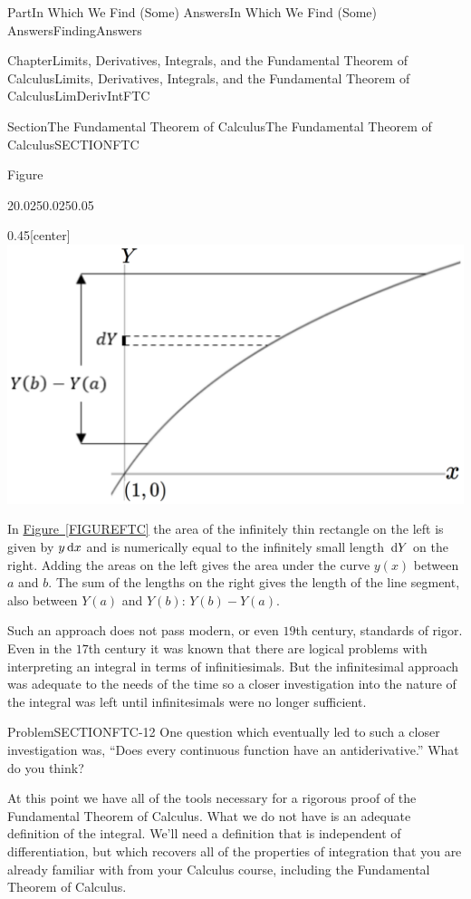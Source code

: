 \documentclass[oneside,10pt,]{book}
\newcommand{\xreffont}{\relax}
\numberwithin{equation}{part}
\newcommand{\dx}[1]{\,{\rm d}#1}
\begin{document}
\begin{partptx}{Part}{In Which We Find (Some) Answers}{}{In Which We Find (Some) Answers}{}{}{FindingAnswers}
\begin{chapterptx}{Chapter}{Limits, Derivatives, Integrals, and the Fundamental Theorem of Calculus}{}{Limits, Derivatives, Integrals, and the Fundamental Theorem of Calculus}{}{}{LimDerivIntFTC}
\begin{sectionptx}{Section}{The Fundamental Theorem of Calculus}{}{The Fundamental Theorem of Calculus}{}{}{SECTIONFTC}
\begin{figureptx}{Figure}
\begin{sidebyside}{2}{0.025}{0.025}{0.05}
\begin{sbspanel}{0.45}[center]%
\noindent\includegraphics[width=\linewidth]{external/images/FTC2.png}
\end{sbspanel}%
\end{sidebyside}%
\tcblower
\end{figureptx}%
In \hyperref[FIGUREFTC]{Figure~{\xreffont\ref{FIGUREFTC}}} the area of the infinitely thin rectangle on the left is given by \(y\dx{x}\) and is numerically equal to the infinitely small length \(\dx{Y}\) on the right.  Adding the areas on the left gives the area under the curve \(y(x)\) between \(a\) and \(b\).  The sum of the lengths on the right gives the length of the line segment, also between \(Y(a)\) and \(Y(b)\): \(Y\left(b\right)-Y(a)\).%
\par
Such an approach does not pass modern, or even \(19\)th century, standards of rigor.  Even in the \(17\)th century it was known that there are logical problems with interpreting an integral in terms of infinitiesimals. But the infinitesimal approach was adequate to the needs of the time so a closer investigation into the nature of the integral was left until infinitesimals were no longer sufficient.%
\begin{problem}{Problem}{}{SECTIONFTC-12}%
One question which eventually led to such a closer investigation was, ``Does every continuous function have an antiderivative.'' What do you think?%
\end{problem}
At this point we have all of the tools necessary for a rigorous proof of the Fundamental Theorem of Calculus. What we do not have is an adequate definition of the integral.    We'll need a definition that is independent of differentiation, but which recovers all of the properties of integration that you are already familiar with from your Calculus course, including the Fundamental Theorem of Calculus.%

\end{sectionptx}
\end{chapterptx}
\end{partptx}
\end{document}
